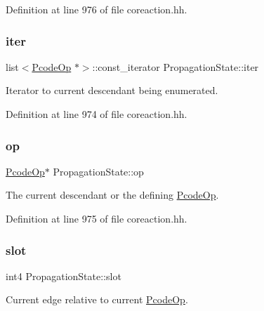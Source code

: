 Definition at line 976 of file coreaction.\+hh.

\mbox{\label{class_propagation_state_a215ac3517dbd555b90e371b4e0303eb3}} 
\subsubsection{\texorpdfstring{iter}{iter}}
{\footnotesize\ttfamily list$<$\mbox{\hyperlink{class_pcode_op}{Pcode\+Op}} $\ast$$>$\+::const\+\_\+iterator Propagation\+State\+::iter}



Iterator to current descendant being enumerated. 



Definition at line 974 of file coreaction.\+hh.

\mbox{\label{class_propagation_state_ae26bcb5e9e3ce711d1f973fd2d7c0e0c}} 
\subsubsection{\texorpdfstring{op}{op}}
{\footnotesize\ttfamily \mbox{\hyperlink{class_pcode_op}{Pcode\+Op}}$\ast$ Propagation\+State\+::op}



The current descendant or the defining \mbox{\hyperlink{class_pcode_op}{Pcode\+Op}}. 



Definition at line 975 of file coreaction.\+hh.

\mbox{\label{class_propagation_state_a205db0b2b585fcb959667eb6745feec8}} 
\subsubsection{\texorpdfstring{slot}{slot}}
{\footnotesize\ttfamily int4 Propagation\+State\+::slot}



Current edge relative to current \mbox{\hyperlink{class_pcode_op}{Pcode\+Op}}. 



